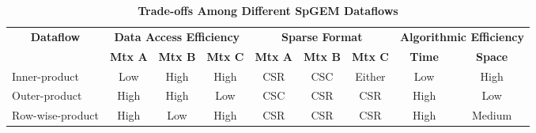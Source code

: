 \begin{table*}[tp]
  \centering
  \cbxsetfontsize{10pt}

  \begin{tabular}{lcccccccc}
  \toprule
  \multicolumn{1}{c}{\multirow{2}{*}{\textbf{Dataflow}}} & \multicolumn{3}{c}{\textbf{Data Access Efficiency}}                           & \multicolumn{3}{c}{\textbf{Sparse Format}}                                    & \multicolumn{2}{c}{\textbf{Algorithmic Efficiency}} \\
  \cmidrule{2-4}  \cmidrule{5-7} \cmidrule{8-9}
  \multicolumn{1}{c}{}                                   & \textbf{Mtx A} & \multicolumn{1}{l}{\textbf{Mtx B}} & \textbf{Mtx C} & \textbf{Mtx A} & \multicolumn{1}{l}{\textbf{Mtx B}} & \textbf{Mtx C} & \textbf{Time}            & \textbf{Space}           \\
  \midrule
  Inner-product                                          & Low               & High                                  & High              & CSR               & CSC                                   & Either            & Low                      & High                     \\
  Outer-product                                          & High              & High                                  & Low               & CSC               & CSR                                   & CSR               & High                     & Low                      \\
  Row-wise-product                                       & High              & Low                                   & High              & CSR               & CSR                                   & CSR               & High                     & Medium                   \\
  \bottomrule
  \end{tabular}

  \caption[Trade-offs Among Different SpGEMM Dataflows]{
    \textbf{Trade-offs Among Different SpGEM Dataflows}
  }
  \label{tab-spz-spgemm-dataflows}

\end{table*}
